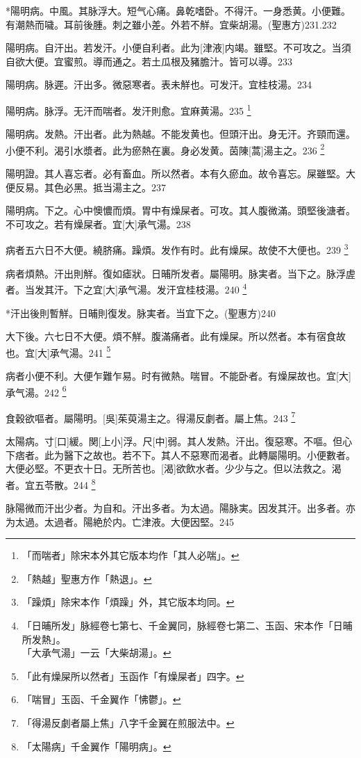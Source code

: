 \documentclass[12pt,twoside,UTF8,b5paper]{ctexbook}
\begin{document}
*陽明病。中風。其脉浮大。短气心痛。鼻乾嗜卧。不得汗。一身悉黄。小便難。有潮熱而噦。耳前後腫。刺之雖小差。外若不觧。宜柴胡湯。(聖惠方)231.232

陽明病。自汗出。若发汗。小便自利者。此为[津液]内竭。雖堅。不可攻之。当須自欲大便。宜蜜煎。導而通之。若土瓜根及豬膽汁。皆可以導。233

陽明病。脉遲。汗出多。微惡寒者。表未觧也。可发汗。宜桂枝湯。234

陽明病。脉浮。无汗而喘者。发汗則愈。宜麻黄湯。235
	\footnote{「而喘者」除宋本外其它版本均作「其人必喘」。}

陽明病。发熱。汗出者。此为熱越。不能发黄也。但頭汗出。身无汗。齐頸而還。小便不利。渴引水漿者。此为瘀熱在裏。身必发黄。茵陳[蒿]湯主之。236
	\footnote{「熱越」聖惠方作「熱退」。}

陽明證。其人喜忘者。必有畜血。所以然者。本有久瘀血。故令喜忘。屎雖堅。大便反易。其色必黑。抵当湯主之。237

陽明病。下之。心中懊憹而煩。胃中有燥屎者。可攻。其人腹微滿。頭堅後溏者。不可攻之。若有燥屎者。宜[大]承气湯。238

病者五六日不大便。繞脐痛。躁煩。发作有时。此有燥屎。故使不大便也。239
	\footnote{「躁煩」除宋本作「煩躁」外，其它版本均同。}

病者煩熱。汗出則觧。復如瘧狀。日晡所发者。屬陽明。脉実者。当下之。脉浮虗者。当发其汗。下之宜[大]承气湯。发汗宜桂枝湯。240
	\footnote{「日晡所发」脉經卷七第七、千金翼同，脉經卷七第二、玉函、宋本作「日晡所发熱」。\\「大承气湯」一云「大柴胡湯」。}

*汗出後則暫觧。日晡則復发。脉実者。当宜下之。(聖惠方)240

大下後。六七日不大便。煩不觧。腹滿痛者。此有燥屎。所以然者。本有宿食故也。宜[大]承气湯。241
	\footnote{「此有燥屎所以然者」玉函作「有燥屎者」四字。}

病者小便不利。大便乍難乍易。时有微熱。喘冒。不能卧者。有燥屎故也。宜[大]承气湯。242
	\footnote{「喘冒」玉函、千金翼作「怫鬱」。}

食穀欲嘔者。屬陽明。[吳]茱萸湯主之。得湯反劇者。屬上焦。243
	\footnote{「得湯反劇者屬上焦」八字千金翼在煎服法中。}

太陽病。寸[口]緩。関[上小]浮。尺[中]弱。其人发熱。汗出。復惡寒。不嘔。但心下痞者。此为醫下之故也。若不下。其人不惡寒而渴者。此轉屬陽明。小便數者。大便必堅。不更衣十日。无所苦也。[渴]欲飲水者。少少与之。但以法救之。渴者。宜五苓散。244
	\footnote{「太陽病」千金翼作「陽明病」。}

脉陽微而汗出少者。为自和。汗出多者。为太過。陽脉実。因发其汗。出多者。亦为太過。太過者。陽絶於内。亡津液。大便因堅。245
\end{document}
